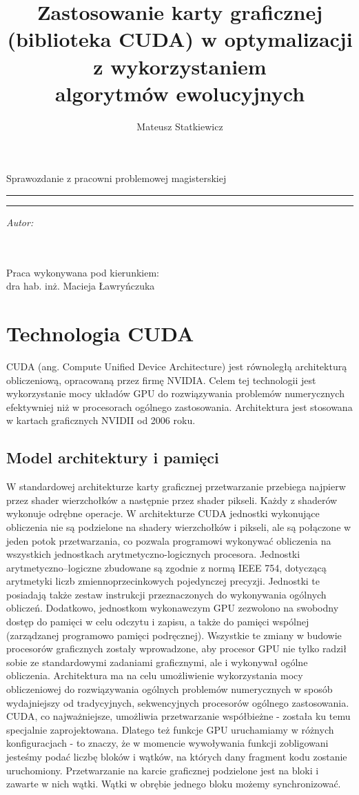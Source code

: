 \documentclass[12pt,a4paper]{article}
\author{Mateusz Statkiewicz }
\title{Zastosowanie karty graficznej \\(biblioteka CUDA) w optymalizacji\\ z wykorzystaniem \\algorytmów ewolucyjnych
}
\makeatletter
\newcommand{\linia}{\rule{\linewidth}{0.4mm}}
\renewcommand{\maketitle}{\begin{titlepage}
    \vspace*{1cm}
    \begin{center}\small
    Sprawozdanie z pracowni problemowej magisterskiej
    \end{center}
    \vspace{3cm}
    \noindent\linia
    \begin{center}
      \LARGE \textsc{\@title}
         \end{center}
     \linia
    \vspace{1cm}
    \begin{flushright}
    \begin{minipage}{5cm}
    \textit{\small Autor:}\\
    \normalsize \textsc{\@author} \\
    \end{minipage}
    \vspace{1cm}
     {\small \\Praca wykonywana pod kierunkiem:}\\
         dra hab. inż. Macieja Ławryńczuka
     \end{flushright}
    \vspace{5cm}
    \begin{center}
    \@date
    \end{center}
  \end{titlepage}%
}
\makeatother
\begin{document}
\maketitle
\onehalfspacing
\section{Technologia CUDA}
\linespread{1,3}
\indent CUDA (ang. Compute Unified Device Architecture) jest równoległą architekturą obliczeniową, opracowaną przez firmę NVIDIA. Celem tej technologii jest wykorzystanie mocy układów GPU do rozwiązywania problemów numerycznych efektywniej niż w procesorach ogólnego zastosowania. Architektura jest stosowana w kartach graficznych NVIDII od 2006 roku.
\subsection{Model architektury i pamięci}
\indent W standardowej architekturze karty graficznej przetwarzanie przebiega najpierw przez shader wierzchołków a następnie przez shader pikseli. Każdy z shaderów wykonuje odrębne operacje. W architekturze CUDA jednostki wykonujące obliczenia nie są podzielone na shadery wierzchołków i pikseli, ale są połączone w jeden potok przetwarzania, co pozwala programowi wykonywać obliczenia na wszystkich jednostkach arytmetyczno-logicznych procesora. Jednostki arytmetyczno–logiczne zbudowane są zgodnie z normą IEEE 754, dotyczącą arytmetyki liczb zmiennoprzecinkowych pojedynczej precyzji. Jednostki te posiadają także zestaw instrukcji przeznaczonych do wykonywania ogólnych obliczeń. Dodatkowo, jednostkom wykonawczym GPU zezwolono na swobodny dostęp do pamięci w celu odczytu i zapisu, a także do pamięci wspólnej (zarządzanej programowo pamięci podręcznej). Wszystkie te zmiany w budowie procesorów graficznych zostały wprowadzone, aby procesor GPU nie tylko radził sobie ze standardowymi zadaniami graficznymi, ale i wykonywał ogólne obliczenia. Architektura ma na celu umożliwienie wykorzystania mocy obliczeniowej do rozwiązywania ogólnych problemów numerycznych w sposób wydajniejszy od tradycyjnych, sekwencyjnych procesorów ogólnego zastosowania.
\\\indent CUDA, co najważniejsze, umożliwia przetwarzanie współbieżne - została ku temu specjalnie zaprojektowana. Dlatego też funkcje GPU uruchamiamy w różnych konfiguracjach - to znaczy, że w momencie wywoływania funkcji zobligowani jesteśmy podać liczbę bloków i wątków, na których dany fragment kodu zostanie uruchomiony. Przetwarzanie na karcie graficznej podzielone jest na bloki i zawarte w nich wątki. Wątki w obrębie jednego bloku możemy synchronizować. 
\end{document}
